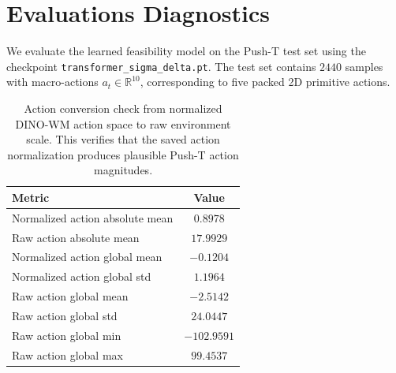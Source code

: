 \section{Evaluations Diagnostics}

\label{app:feasibility_eval}
We evaluate the learned feasibility model on the Push-T test set using the checkpoint
\texttt{transformer\_sigma\_delta.pt}. The test set contains \(2440\) samples with macro-actions
\(a_t\in\mathbb{R}^{10}\), corresponding to five packed 2D primitive actions.

\begin{table}[h]
\centering
\small
\caption{Action conversion check from normalized DINO-WM action space to raw environment scale. 
This verifies that the saved action normalization produces plausible Push-T action magnitudes.}
\label{tab:action_conversion_check}
\begin{tabular}{lc}
\toprule
Metric & Value \\
\midrule
Normalized action absolute mean & \(0.8978\) \\
Raw action absolute mean & \(17.9929\) \\
Normalized action global mean & \(-0.1204\) \\
Normalized action global std & \(1.1964\) \\
Raw action global mean & \(-2.5142\) \\
Raw action global std & \(24.0447\) \\
Raw action global min & \(-102.9591\) \\
Raw action global max & \(99.4537\) \\
\bottomrule
\end{tabular}
\end{table}

